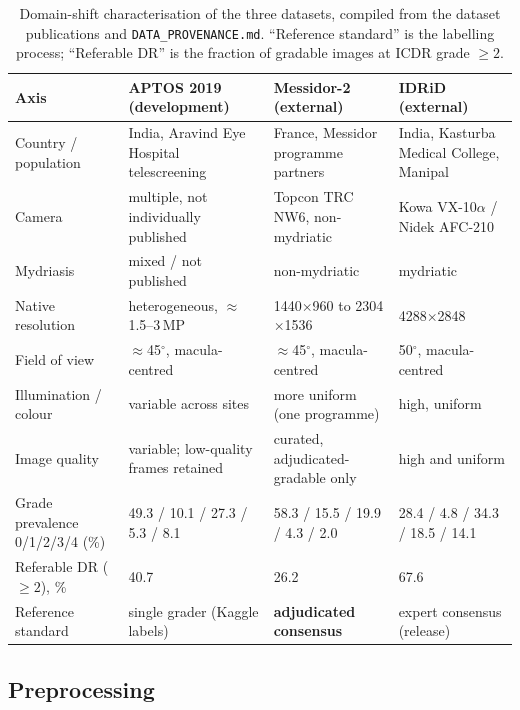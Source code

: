 \documentclass[journal]{IEEEtran}
\begin{document}
\begin{table}[!t]
\centering\footnotesize
\caption{Domain-shift characterisation of the three datasets, compiled from the
dataset publications and \texttt{DATA\_PROVENANCE.md}. ``Reference standard'' is
the labelling process; ``Referable DR'' is the fraction of gradable images at
ICDR grade $\geq 2$.}
\label{tab:shift}
\setlength{\tabcolsep}{4pt}
\begin{tabular}{@{}l p{} p{} p{}@{}}
\toprule
Axis & APTOS 2019 (development) & Messidor-2 (external) & IDRiD (external) \\
\midrule
Country / population & India, Aravind Eye Hospital telescreening & France, Messidor programme partners & India, Kasturba Medical College, Manipal \\
Camera & multiple, not individually published & Topcon TRC NW6, non-mydriatic & Kowa VX-10$\alpha$ / Nidek AFC-210 \\
Mydriasis & mixed / not published & non-mydriatic & mydriatic \\
Native resolution & heterogeneous, $\approx$1.5--3\,MP & 1440$\times$960 to 2304$\times$1536 & 4288$\times$2848 \\
Field of view & $\approx$45$^\circ$, macula-centred & $\approx$45$^\circ$, macula-centred & 50$^\circ$, macula-centred \\
Illumination / colour & variable across sites & more uniform (one programme) & high, uniform \\
Image quality & variable; low-quality frames retained & curated, adjudicated-gradable only & high and uniform \\
Grade prevalence 0/1/2/3/4 (\%) & 49.3 / 10.1 / 27.3 / 5.3 / 8.1 & 58.3 / 15.5 / 19.9 / 4.3 / 2.0 & 28.4 / 4.8 / 34.3 / 18.5 / 14.1 \\
Referable DR ($\geq 2$), \% & 40.7 & 26.2 & 67.6 \\
Reference standard & single grader (Kaggle labels) & \textbf{adjudicated consensus} \cite{krause2018} & expert consensus (release) \\
\bottomrule
\end{tabular}
\end{table}

\subsection{Preprocessing}
\label{sec:methods-pre}
\end{document}

